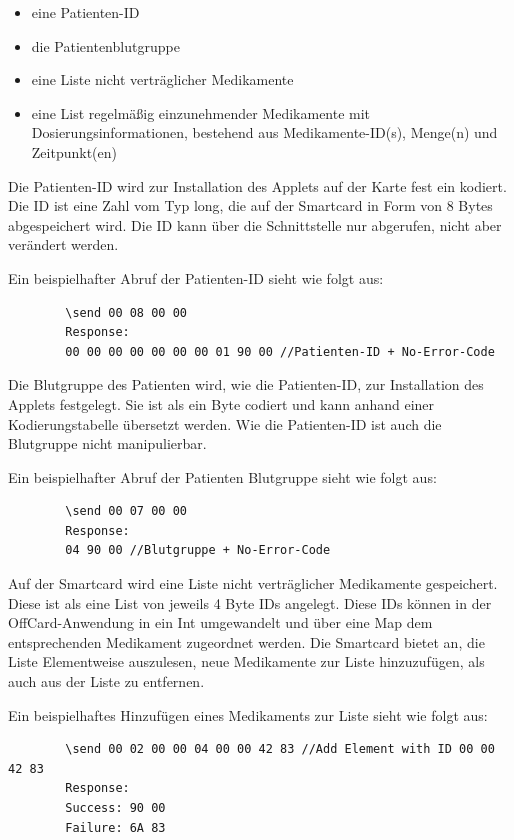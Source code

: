 \documentclass[parskip]{scrartcl}
\begin{document}
	\begin{itemize}
		\item eine Patienten-ID
		\item die Patientenblutgruppe
		\item eine Liste nicht verträglicher Medikamente
		\item eine List regelmäßig einzunehmender Medikamente mit Dosierungsinformationen, bestehend aus Medikamente-ID(s), Menge(n) und Zeitpunkt(en)
	\end{itemize}
	
	Die Patienten-ID wird zur Installation des Applets auf der Karte fest ein kodiert. Die ID ist eine Zahl vom Typ long, die auf der Smartcard in Form von 8 Bytes abgespeichert wird. Die ID kann über die Schnittstelle nur abgerufen, nicht aber verändert werden.
	
	Ein beispielhafter Abruf der Patienten-ID sieht wie folgt aus:
	
	\begin{lstlisting}
		\send 00 08 00 00
		Response:
		00 00 00 00 00 00 00 01 90 00 //Patienten-ID + No-Error-Code
	\end{lstlisting}
	
	Die Blutgruppe des Patienten wird, wie die Patienten-ID, zur Installation des Applets festgelegt. Sie ist als ein Byte codiert und kann anhand einer Kodierungstabelle übersetzt werden. Wie die Patienten-ID ist auch die Blutgruppe nicht manipulierbar.
	
	Ein beispielhafter Abruf der Patienten Blutgruppe sieht wie folgt aus:
	
	\begin{lstlisting}
		\send 00 07 00 00
		Response:
		04 90 00 //Blutgruppe + No-Error-Code
	\end{lstlisting}
	
	Auf der Smartcard wird eine Liste nicht verträglicher Medikamente gespeichert. Diese ist als eine List von jeweils 4 Byte IDs angelegt. Diese IDs können in der OffCard-Anwendung in ein Int umgewandelt und über eine Map dem entsprechenden Medikament zugeordnet werden. Die Smartcard bietet an, die Liste Elementweise auszulesen, neue Medikamente zur Liste hinzuzufügen, als auch aus der Liste zu entfernen.
	
	Ein beispielhaftes Hinzufügen eines Medikaments zur Liste sieht wie folgt aus:
	
	\begin{lstlisting}
		\send 00 02 00 00 04 00 00 42 83 //Add Element with ID 00 00 42 83
		Response:
		Success: 90 00
		Failure: 6A 83
	\end{lstlisting}
	
\end{document}
